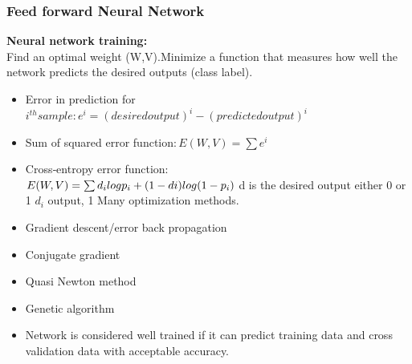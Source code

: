 \documentclass[a4paper,14pt,onecolumn]{article}
\begin{document}
\subsubsection{Feed forward Neural Network}
\textbf{Neural network training:}\\
Find an optimal weight (W,V).Minimize a function that measures how well the network predicts the desired outputs (class label).
\begin{itemize}
\item Error in prediction for \begin{math} i^{th} sample:
                               e^{i} = {(desired output)^i - (predicted output)^i} \                  
                                         \end{math}
\item Sum of squared error function:\,\begin{math}
                                   E(W,V) = \sum e^i
                                     \end{math}     
\item Cross‐entropy error function:\\ \begin{math}
                           E(W,V) =\- \sum d_i log p_i + (1 - di) log (1 -  p_i)\\\end{math}
  d is the desired output either 0 or 1  \begin{math}d_i \end{math} output, 1 Many optimization methods.          
\item  Gradient descent/error back propagation
\item  Conjugate gradient
\item  Quasi Newton method
\item  Genetic algorithm  
\item  Network is considered well trained if it can predict training data and cross validation data with acceptable accuracy.                                               
\end{itemize}
\end{document}
